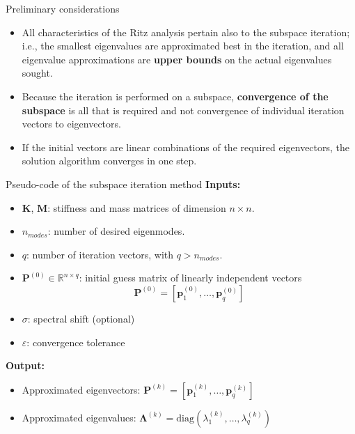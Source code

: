 \documentclass[aspectratio=169]{beamer}
\begin{document}
\begin{frame}{Preliminary considerations}
  \begin{itemize}
    \item  All characteristics of the Ritz analysis pertain also to the subspace iteration; i.e., the smallest eigenvalues are approximated best in the iteration, and all eigenvalue approximations are \textbf{upper bounds} on the actual eigenvalues sought.
    \item Because the iteration is performed on a subspace, \textbf{convergence of the subspace} is all that is required and not convergence of individual iteration vectors to eigenvectors.
    \item If the initial vectors are linear combinations of the required eigenvectors, the solution algorithm converges in one step.
  \end{itemize}
\end{frame}

\begin{frame}{Pseudo-code of the subspace iteration method}
  \textbf{Inputs:}
  \begin{itemize}
    \item \(\mathbf K \), \(\mathbf M \): stiffness and mass matrices of dimension \( n \times n \).
    \item \( n_{modes} \): number of desired eigenmodes.
    \item \( q \): number of iteration vectors, with \( q > n_{modes} \).
    \item \(\mathbf P^{(0)} \in \mathbb{R}^{n \times q} \): initial guess matrix of linearly independent vectors
          $$\mathbf  P^{(0)}=[\mathbf p^{(0)}_1,\dots,\mathbf p^{(0)}_q]$$
    \item \( \sigma \): spectral shift (optional)
    \item \( \varepsilon \): convergence tolerance
  \end{itemize}

  \textbf{Output:}
  \begin{itemize}
    \item  Approximated eigenvectors: $\mathbf  P^{(k)}=[\mathbf p^{(k)}_1,\dots,\mathbf p^{(k)}_q]$
    \item Approximated eigenvalues: $\mathbf \Lambda^{(k)}=\text{diag}(\lambda^{(k)}_1,\dots,\lambda^{(k)}_q)$
  \end{itemize}
\end{frame}
\end{document}

